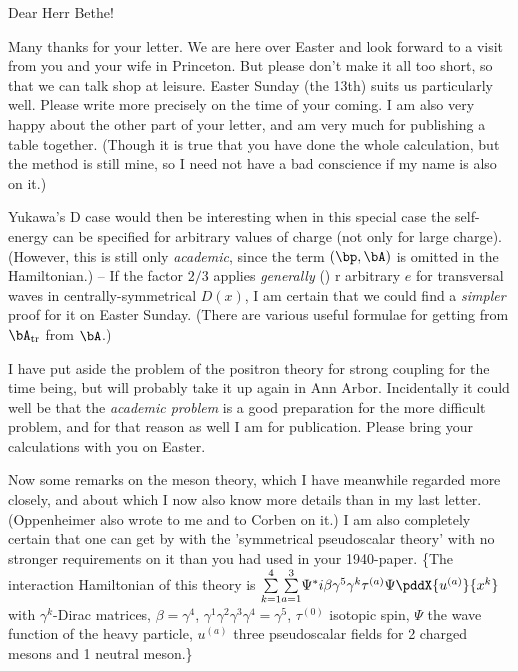 \date{April 4, 1941}


Dear Herr Bethe!

Many thanks for your letter. We are here over Easter and look forward to a visit from you and your wife in Princeton. But please don't make it all too short, so that we can talk shop at leisure. Easter Sunday (the 13th) suits us particularly well. Please write more precisely on the time of your coming. I am also very happy about the other part of your letter, and am very much for publishing a table together. (Though it is true that you have done the whole calculation, but the method is still mine, so I need not have a bad conscience if my name is also on it.)

Yukawa's D case would then be interesting when in this special case the self-energy can be specified for arbitrary values of charge (not only for large charge). (However, this is still only \textit{academic}, since the term $(\bp, \bA)$ is omitted in the Hamiltonian.) -- If the factor $2/3$ applies \textit{generally} ()
r arbitrary $e$
 for transversal waves in centrally-symmetrical $D(x)$, I am certain that we could find a \textit{simpler} proof for it on Easter Sunday. (There are various useful formulae for getting from $\bA_\text{tr}$ from $\bA$.)
 
I have put aside the problem of the positron theory for strong coupling for the time being, but will probably take it up again in Ann Arbor. Incidentally it could well be that the \textit{academic problem} is a good preparation for the more difficult problem, and for that reason as well I am for publication. Please bring your calculations with you on Easter.

Now some remarks on the meson theory, which I have meanwhile regarded more closely, and about which I now also know more details than in my last letter. (Oppenheimer also wrote to me and to Corben on it.) I am also completely certain that one can get by with the 'symmetrical pseudoscalar theory' with no stronger requirements on it than you had used in your 1940-paper. \{The interaction Hamiltonian of this theory is 
$\sumXY{k=1}{4}\sumXY{a=1}{3}\Psi^*i\beta\gamma^5\gamma^k\tau^{(a)}\Psi\pddX{u^{(a)}}{x^k}$ 
with $\gamma^k$-Dirac matrices, $\beta=\gamma^4$, $\gamma^1\gamma^2\gamma^3\gamma^4=\gamma^5$, $\tau^{(0)}$ isotopic spin, $\Psi$ the wave function of the heavy particle, $u^{(a)}$ three pseudoscalar fields for 2 charged mesons and 1 neutral meson.\}

